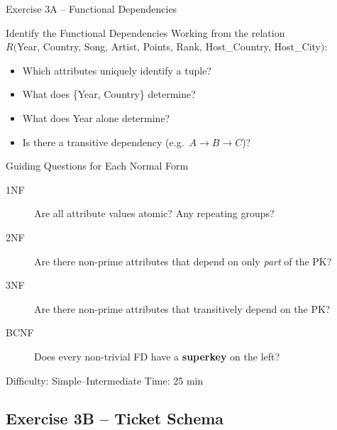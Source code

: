 \documentclass[10pt]{beamer}
\begin{document}
\begin{frame}{Exercise 3A -- Functional Dependencies}
  \begin{block}{Identify the Functional Dependencies}
    Working from the relation\\
    $R($Year, Country, Song, Artist, Points, Rank, Host\_Country, Host\_City$)$:
    \vspace{4pt}
    \begin{itemize}
      \item Which attributes uniquely identify a tuple?
      \item What does \{Year, Country\} determine?
      \item What does Year alone determine?
      \item Is there a transitive dependency (e.g.\ $A \to B \to C$)?
    \end{itemize}
  \end{block}

  \begin{block}{Guiding Questions for Each Normal Form}
    \begin{description}
      \item[1NF] Are all attribute values atomic?  Any repeating groups?
      \item[2NF] Are there non-prime attributes that depend on only \emph{part} of the PK?
      \item[3NF] Are there non-prime attributes that transitively depend on the PK?
      \item[BCNF] Does every non-trivial FD have a \textbf{superkey} on the left?
    \end{description}
  \end{block}

  \begin{alertblock}{Difficulty: Simple--Intermediate \quad Time: 25 min}
  \end{alertblock}
\end{frame}

\subsection{Exercise 3B -- Ticket Schema}
\end{document}
